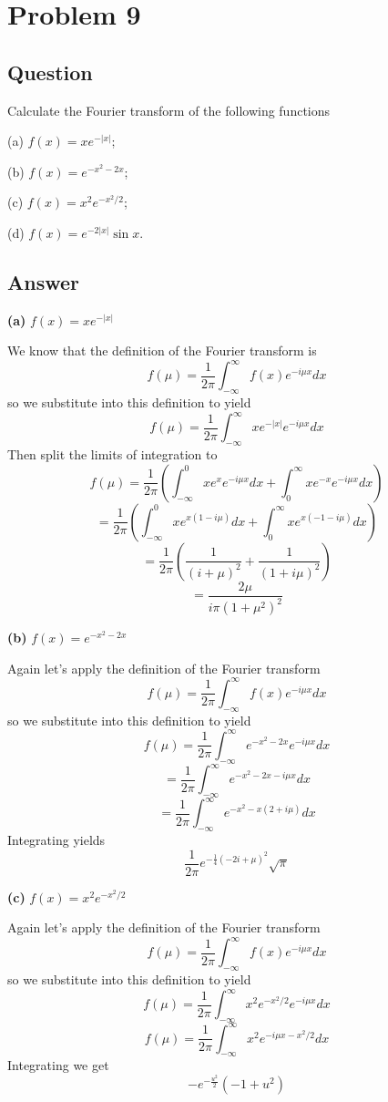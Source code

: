 \documentclass[12pt]{article}
\begin{document}
\section{Problem 9}
\subsection{Question}
Calculate the Fourier transform of the following functions

(a) $f(x) = x e^{-|x|}$;

(b) $f(x) = e^{-x^2 -2x}$;

(c) $f(x) = x^2 e^{-x^2/2}$;

(d) $f(x) = e^{-2 |x|} \sin{x}$.

\subsection{Answer}
\textbf{(a)} \emph{$f(x) = x e^{-|x|}$}

We know that the definition of the Fourier transform is 
\[f(\mu) = \frac{1}{2 \pi} \int_{-\infty}^\infty f(x) e^{-i \mu x} dx\]
so we substitute into this definition to yield
\[f(\mu) = \frac{1}{2 \pi} \int_{-\infty}^\infty  x e^{-|x|} e^{-i \mu x} dx\]
Then split the limits of integration to
\[f(\mu) = \frac{1}{2 \pi} \left( \int_{-\infty}^0  x e^{x} e^{-i \mu x} dx + \int_{0}^\infty  x e^{-x} e^{-i \mu x} dx \right) \]
\[= \frac{1}{2 \pi} \left( \int_{-\infty}^0  x  e^{x(1-i \mu) } dx + \int_{0}^\infty  x  e^{x(-1-i \mu )} dx \right) \]
\[= \frac{1}{2 \pi} \left(\frac{1}{(i+\mu )^2}+\frac{1}{(1+i \mu )^2}\right)\]
\[= \frac{2 \mu}{i \pi (1+\mu^2)^2} \]

\textbf{(b)} \emph{$f(x) = e^{-x^2 -2x}$}

Again let's apply the definition of the Fourier transform
\[f(\mu) = \frac{1}{2 \pi} \int_{-\infty}^\infty f(x) e^{-i \mu x} dx\]
so we substitute into this definition to yield
\[f(\mu) = \frac{1}{2 \pi} \int_{-\infty}^\infty e^{-x^2 -2x} e^{-i \mu x} dx\]
\[= \frac{1}{2 \pi} \int_{-\infty}^\infty e^{-x^2 -2x-i \mu x}  dx\]
\[= \frac{1}{2 \pi} \int_{-\infty}^\infty e^{-x^2 -x(2+i \mu )}  dx\]
Integrating yields
\[\frac{1}{2\pi} e^{-\frac{1}{4} (-2 i+\mu )^2} \sqrt{\pi }\]

\textbf{(c)} \emph{$f(x) = x^2 e^{-x^2/2}$}

Again let's apply the definition of the Fourier transform
\[f(\mu) = \frac{1}{2 \pi} \int_{-\infty}^\infty f(x) e^{-i \mu x} dx\]
so we substitute into this definition to yield
\[f(\mu) = \frac{1}{2 \pi} \int_{-\infty}^\infty x^2 e^{-x^2/2} e^{-i \mu x} dx\]
\[f(\mu) = \frac{1}{2 \pi} \int_{-\infty}^\infty x^2  e^{-i \mu x -x^2/2} dx\]
Integrating we get 
\[-e^{-\frac{u^2}{2}} \left(-1+u^2\right)\]
\end{document}

